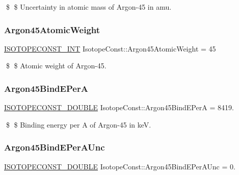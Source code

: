\$ \$ Uncertainty in atomic mass of Argon-\/45 in amu. \mbox{\label{group___isotope_const-_argon-_ar45_ga69825735fc7c7288c41d9f7e10f5728e}} 
\subsubsection{\texorpdfstring{Argon45\+Atomic\+Weight}{Argon45AtomicWeight}}
{\footnotesize\ttfamily \mbox{\hyperlink{group___isotope_const-_macros_ga5f18360b3e99483a35c32d789e62621c}{I\+S\+O\+T\+O\+P\+E\+C\+O\+N\+S\+T\+\_\+\+I\+NT}} Isotope\+Const\+::\+Argon45\+Atomic\+Weight = 45}

\$ \$ Atomic weight of Argon-\/45. \mbox{\label{group___isotope_const-_argon-_ar45_ga890957e4bf53cf2749050e47b39f1409}} 
\subsubsection{\texorpdfstring{Argon45\+Bind\+E\+PerA}{Argon45BindEPerA}}
{\footnotesize\ttfamily \mbox{\hyperlink{group___isotope_const-_macros_ga8f45a7272ce02c0b4c65c44636ed719a}{I\+S\+O\+T\+O\+P\+E\+C\+O\+N\+S\+T\+\_\+\+D\+O\+U\+B\+LE}} Isotope\+Const\+::\+Argon45\+Bind\+E\+PerA = 8419.}

\$ \$ Binding energy per A of Argon-\/45 in keV. \mbox{\label{group___isotope_const-_argon-_ar45_ga6ee2635ea87814e79161c6d190e1c2d7}} 
\subsubsection{\texorpdfstring{Argon45\+Bind\+E\+Per\+A\+Unc}{Argon45BindEPerAUnc}}
{\footnotesize\ttfamily \mbox{\hyperlink{group___isotope_const-_macros_ga8f45a7272ce02c0b4c65c44636ed719a}{I\+S\+O\+T\+O\+P\+E\+C\+O\+N\+S\+T\+\_\+\+D\+O\+U\+B\+LE}} Isotope\+Const\+::\+Argon45\+Bind\+E\+Per\+A\+Unc = 0.}

